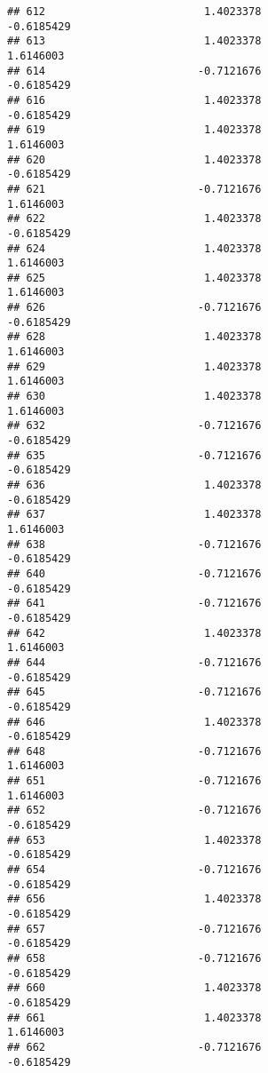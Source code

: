 \documentclass[
]{article}
\begin{document}
\begin{verbatim}
## 612                         1.4023378                       -0.6185429
## 613                         1.4023378                        1.6146003
## 614                        -0.7121676                       -0.6185429
## 616                         1.4023378                       -0.6185429
## 619                         1.4023378                        1.6146003
## 620                         1.4023378                       -0.6185429
## 621                        -0.7121676                        1.6146003
## 622                         1.4023378                       -0.6185429
## 624                         1.4023378                        1.6146003
## 625                         1.4023378                        1.6146003
## 626                        -0.7121676                       -0.6185429
## 628                         1.4023378                        1.6146003
## 629                         1.4023378                        1.6146003
## 630                         1.4023378                        1.6146003
## 632                        -0.7121676                       -0.6185429
## 635                        -0.7121676                       -0.6185429
## 636                         1.4023378                       -0.6185429
## 637                         1.4023378                        1.6146003
## 638                        -0.7121676                       -0.6185429
## 640                        -0.7121676                       -0.6185429
## 641                        -0.7121676                       -0.6185429
## 642                         1.4023378                        1.6146003
## 644                        -0.7121676                       -0.6185429
## 645                        -0.7121676                       -0.6185429
## 646                         1.4023378                       -0.6185429
## 648                        -0.7121676                        1.6146003
## 651                        -0.7121676                        1.6146003
## 652                        -0.7121676                       -0.6185429
## 653                         1.4023378                       -0.6185429
## 654                        -0.7121676                       -0.6185429
## 656                         1.4023378                       -0.6185429
## 657                        -0.7121676                       -0.6185429
## 658                        -0.7121676                       -0.6185429
## 660                         1.4023378                       -0.6185429
## 661                         1.4023378                        1.6146003
## 662                        -0.7121676                       -0.6185429

\end{verbatim}
\end{document}
